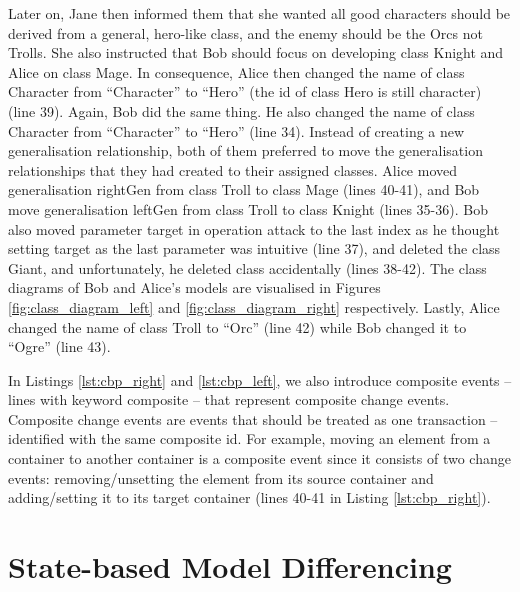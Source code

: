 Later on, Jane then informed them that she wanted all good characters should be derived from a general, hero-like class, and the enemy should be the Orcs not Trolls. She also instructed that Bob should focus on developing class \textsf{Knight} and Alice on class \textsf{Mage}. In consequence, Alice then changed the name of class \textsf{Character} from ``Character'' to ``Hero'' (the id of class \textsf{Hero} is still \textsf{character}) (line 39). Again, Bob did the same thing. He also changed the name of class \textsf{Character} from ``Character'' to ``Hero'' (line 34). Instead of creating a new generalisation relationship, both of them preferred to move the generalisation relationships that they had created to their assigned classes. Alice moved generalisation \textsf{rightGen} from class \textsf{Troll} to class \textsf{Mage} (lines 40-41), and Bob move generalisation \textsf{leftGen} from class \textsf{Troll} to class \textsf{Knight} (lines 35-36). Bob also moved parameter \textsf{target} in operation \textsf{attack} to the last index as he thought setting target as the last parameter was intuitive (line 37), and deleted the class {Giant}, and unfortunately, he deleted class  accidentally (lines 38-42). The class diagrams of Bob and Alice's models are visualised in Figures \ref{fig:class_diagram_left} and \ref{fig:class_diagram_right} respectively. Lastly, Alice changed the \textsf{name} of class \textsf{Troll} to ``Orc'' (line 42) while Bob changed it to ``Ogre'' (line 43).  

In Listings \ref{lst:cbp_right} and \ref{lst:cbp_left}, we also introduce composite events -- lines with keyword \textsf{composite} -- that represent composite change events. 
Composite change events are events that should be treated as one transaction -- identified with the same composite id. 
For example, moving an element from a container to another container is a composite event since it consists of two change events: 
removing/unsetting the element from its source container and adding/setting it to its target container (lines 40-41 in Listing \ref{lst:cbp_right}).

\section{State-based Model Differencing}
\label{sec:state-based_model_differencing}

